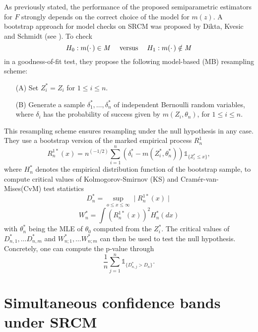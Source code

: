 As previously stated, the performance of the proposed semiparametric estimators for $F$ strongly depends on the correct choice of the model for $m(z)$. A bootstrap approach for model checks on SRCM was proposed by Dikta, Kvesic and Schmidt (see \cite{PAPER4}). To check
\[
H_0: m(\cdotp) \in \mathit{M} \text{\hspace{3ex}versus\hspace{3ex}} H_1:  m(\cdotp) \notin \mathit{M}
\] 
in a goodness-of-fit test, they propose the following model-based (MB) resampling scheme:
\begin{resampling_scheme}\label{mb_rs}
\begin{enumerate}
\item[(A)] Set $Z_i^* = Z_i$ for $1 \leq i \leq n$.
\item[(B)] Generate a sample $\delta_1^*,\ldots,\delta_n^*$ of independent Bernoulli random variables, where $\delta_i$ has the probability of success given by $m(Z_i,\theta_n)$, for $1 \leq i \leq n$.
\end{enumerate}
\end{resampling_scheme}
This resampling scheme ensures resampling under the null hypothesis in any case.
They use a bootstrap version of the marked empirical process $R_n^1$ 
\[
R_n^{1*}(x) = n^{(-1/2)}\sum_{i=1}^n\left( \delta_i^* - m(Z_i^*,\theta_n^*)\right) \mathbb{1}_{\{Z_i^*\leq x\}}, 
\]
where $H_n^*$ denotes the empirical distribution function of the bootstrap sample,
to compute critical values of Kolmogorov-Smirnov (KS) and Cramér-van-Mises(CvM) test statistics
\[
D_n^* = \sup_{o\leq x \leq \infty} \mid R_n^{1*}(x)\mid
\]
\[
W_n^*  = \int (R_n^{1*}(x))^2 H_n^*(dx)
\]
with $\theta_n^*$ being the MLE of $\theta_0$ computed from the $Z_i^*$.
The critical values of $D_{n,1}^*,\ldots D_{n,m}^*$ and $W_{n;1}^*,\ldots W_{n;m}^*$ can then be used to test the null hypothesis. Concretely, one can compute the p-value through 
\[
\frac{1}{n} \sum_{j=1}^n \mathbb{1}_{\{D_{n,j}^*>D_n\}}.
\]

\section{Simultaneous confidence bands under SRCM}

